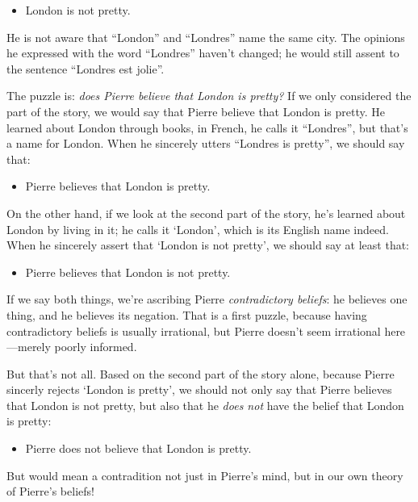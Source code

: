 \documentclass[../../../include/open-logic-chapter]{subfiles}
\begin{document}
\begin{itemize}
\item London is not pretty.
\end{itemize}

He is not aware that ``London'' and ``Londres'' name the same city.
The opinions he expressed with the word ``Londres'' haven't changed;
he would still assent to the sentence ``Londres est jolie''. 

The puzzle is: \emph{does Pierre believe that London is pretty?} If we only  considered the part of the story, we would say that Pierre believe 
that London is pretty. He learned about London through books, in French,
he calls it ``Londres'', but that's a name for London. When he sincerely
utters ``Londres is pretty'', we should say that:

\begin{itemize}
\item Pierre believes that London is pretty. 
\end{itemize}

On the other hand, if we look at the second part of the story, he's
learned about London by living in it; he calls it `London', which 
is its English name indeed. When he sincerely assert that `London 
is not pretty', we should say at least that:

\begin{itemize}
\item Pierre believes that London is not pretty. 
\end{itemize}

If we say both things, we're ascribing Pierre \emph{contradictory beliefs}: he believes one thing, and he believes its negation. That
is a first puzzle, because having contradictory beliefs is usually
irrational, but Pierre doesn't seem irrational here---merely poorly
informed.

But that's not all. Based on the second part of the story alone, because 
Pierre sincerly rejects `London is pretty', we should not only say 
that Pierre believes that London is not pretty, but also that he \emph{does not} have the belief that London is pretty:

\begin{itemize}
\item Pierre does not believe that London is pretty. 
\end{itemize}

But would mean a contradition not just in Pierre's mind, but in our 
own theory of Pierre's beliefs! 
\end{document}
